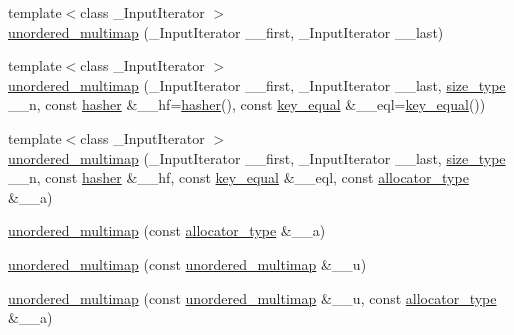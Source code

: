 \begin{DoxyCompactItemize}
\item 
{\footnotesize template$<$class \+\_\+\+Input\+Iterator $>$ }\\\hyperlink{classunordered__multimap_af7829207aef36c7dd52a7e55780ed86d}{unordered\+\_\+multimap} (\+\_\+\+Input\+Iterator \+\_\+\+\_\+first, \+\_\+\+Input\+Iterator \+\_\+\+\_\+last)
\item 
{\footnotesize template$<$class \+\_\+\+Input\+Iterator $>$ }\\\hyperlink{classunordered__multimap_af00ca614f7641ef62c552540dd846d46}{unordered\+\_\+multimap} (\+\_\+\+Input\+Iterator \+\_\+\+\_\+first, \+\_\+\+Input\+Iterator \+\_\+\+\_\+last, \hyperlink{classunordered__multimap_a977c4093df6d4d0302f280de19af4b58}{size\+\_\+type} \+\_\+\+\_\+n, const \hyperlink{classunordered__multimap_a93affc33f5ee930cff353ff62d20daef}{hasher} \&\+\_\+\+\_\+hf=\hyperlink{classunordered__multimap_a93affc33f5ee930cff353ff62d20daef}{hasher}(), const \hyperlink{classunordered__multimap_aeed817e3baaf0771b8336eb2477f4f02}{key\+\_\+equal} \&\+\_\+\+\_\+eql=\hyperlink{classunordered__multimap_aeed817e3baaf0771b8336eb2477f4f02}{key\+\_\+equal}())
\item 
{\footnotesize template$<$class \+\_\+\+Input\+Iterator $>$ }\\\hyperlink{classunordered__multimap_ae65029d3be22defe22edb63354b9977b}{unordered\+\_\+multimap} (\+\_\+\+Input\+Iterator \+\_\+\+\_\+first, \+\_\+\+Input\+Iterator \+\_\+\+\_\+last, \hyperlink{classunordered__multimap_a977c4093df6d4d0302f280de19af4b58}{size\+\_\+type} \+\_\+\+\_\+n, const \hyperlink{classunordered__multimap_a93affc33f5ee930cff353ff62d20daef}{hasher} \&\+\_\+\+\_\+hf, const \hyperlink{classunordered__multimap_aeed817e3baaf0771b8336eb2477f4f02}{key\+\_\+equal} \&\+\_\+\+\_\+eql, const \hyperlink{classunordered__multimap_a821ff3be687cecd9ef325efa93759c19}{allocator\+\_\+type} \&\+\_\+\+\_\+a)
\item 
\hyperlink{classunordered__multimap_a58d14916504aa44b43bda4970ed4de03}{unordered\+\_\+multimap} (const \hyperlink{classunordered__multimap_a821ff3be687cecd9ef325efa93759c19}{allocator\+\_\+type} \&\+\_\+\+\_\+a)
\item 
\hyperlink{classunordered__multimap_ae2a482dd86bbc7f611f53b61a905de90}{unordered\+\_\+multimap} (const \hyperlink{classunordered__multimap}{unordered\+\_\+multimap} \&\+\_\+\+\_\+u)
\item 
\hyperlink{classunordered__multimap_a41d280f0f2fe9d49aa03aea294e7f776}{unordered\+\_\+multimap} (const \hyperlink{classunordered__multimap}{unordered\+\_\+multimap} \&\+\_\+\+\_\+u, const \hyperlink{classunordered__multimap_a821ff3be687cecd9ef325efa93759c19}{allocator\+\_\+type} \&\+\_\+\+\_\+a)

\end{DoxyCompactItemize}
